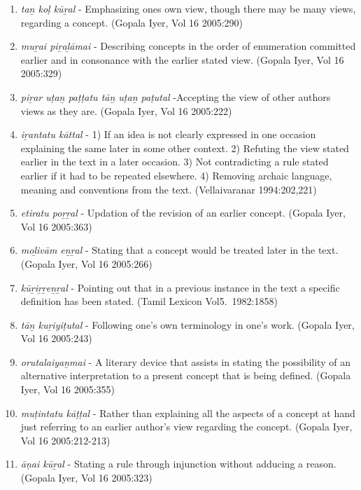 \begin{enumerate}
 \item \textit{taṉ koḷ kūṟal} - Emphasizing ones own view, though there may be many views, regarding a concept. (Gopala Iyer, Vol 16 2005:290)

 \item \textit{muṟai piṟaḻāmai} - Describing concepts in the order of enumeration committed earlier and in consonance with the earlier stated view. (Gopala Iyer, Vol 16 2005:329)

 \item \textit{piṟar uṭaṉ paṭṭatu tāṉ uṭaṉ paṭutal} -Accepting the view of other authors views as they are. (Gopala Iyer, Vol 16 2005:222)

 \item \textit{iṟantatu kāttal} - 1) If an idea is not clearly expressed in one occasion explaining the same later in some other context. 2) Refuting the view stated earlier in the text in a later occasion. 3) Not contradicting a rule stated earlier if it had to be repeated elsewhere. 4) Removing archaic language, meaning and conventions from the text. (Vellaivaranar 1994:202,221)

 \item \textit{etiratu poṟṟal} - Updation of the revision of an earlier concept. (Gopala Iyer, Vol 16 2005:363)

 \item \textit{moḻivām eṉṟal} - Stating that a concept would be treated later in the text. (Gopala Iyer, Vol 16 2005:266)

 \item \textit{kūṟiṟṟeṉṟal} - Pointing out that in a previous instance in the text a specific definition has been stated. (Tamil Lexicon Vol5.~1982:1858)

 \item \textit{tāṉ kuṟiyiṭutal} - Following one’s own terminology in one’s work. (Gopala Iyer, Vol 16 2005:243)

 \item \textit{orutalaiyaṉmai} - A literary device that assists in stating the possibility of an alternative interpretation to a present concept that is being defined. (Gopala Iyer, Vol 16 2005:355)

 \item \textit{muṭintatu kāṭṭal} - Rather than explaining all the aspects of a concept at hand just referring to an earlier author’s view regarding the concept. (Gopala Iyer, Vol 16 2005:212-213)

 \item \textit{āṇai kūṟal} - Stating a rule through injunction without adducing a reason. (Gopala Iyer, Vol 16 2005:323)


\end{enumerate}
